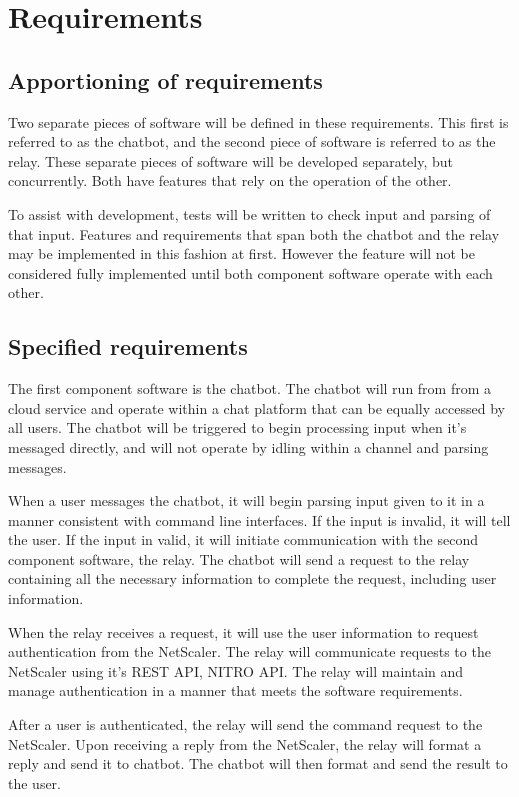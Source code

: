 \documentclass[onecolumn, draftclsnofoot,10pt, compsoc]{IEEEtran}
\begin{document}
\section{Requirements}
\subsection{Apportioning of requirements}
Two separate pieces of software will be defined in these requirements.
This first is referred to as the chatbot, and the second piece of software is referred to as the relay.
These separate pieces of software will be developed separately, but concurrently.
Both have features that rely on the operation of the other.

To assist with development, tests will be written to check input and parsing of that input.
Features and requirements that span both the chatbot and the relay may be implemented in this fashion at first.
However the feature will not be considered fully implemented until both component software operate with each other.

\subsection{Specified requirements}
The first component software is the chatbot.
The chatbot will run from from a cloud service and operate within a chat platform that can be equally accessed by all users.
The chatbot will be triggered to begin processing input when it's messaged directly, and will not operate by idling within a channel and parsing messages.

When a user messages the chatbot, it will begin parsing input given to it in a manner consistent with command line interfaces.
If the input is invalid, it will tell the user.
If the input in valid, it will initiate communication with the second component software, the relay.
The chatbot will send a request to the relay containing all the necessary information to complete the request, including user information.

When the relay receives a request, it will use the user information to request authentication from the NetScaler.
The relay will communicate requests to the NetScaler using it's REST API, NITRO API.
The relay will maintain and manage authentication in a manner that meets the software requirements.

After a user is authenticated, the relay will send the command request to the NetScaler.
Upon receiving a reply from the NetScaler, the relay will format a reply and send it to chatbot.
The chatbot will then format and send the result to the user.
    
\end{document}
